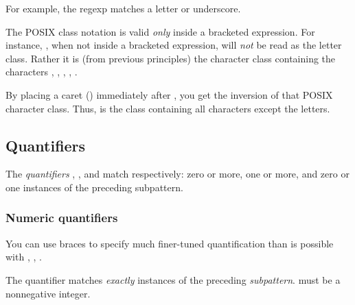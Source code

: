 {\medskip

\n For example, the regexp  
matches a letter or underscore.


The POSIX class notation is valid {\em only} inside a
bracketed expression.  For instance, \p{[:alpha:]},
when not inside a bracketed expression, will {\em not}
be read as the letter class.
Rather it is (from previous principles) the character
class containing the characters \p{:}, , ,
, .


By placing a caret (\p{^}) immediately after
\p{[:}, you get the inversion of that POSIX
character class.  Thus, \p{[:^alpha]}
is the class containing all characters
except the letters.

\subsection{Quantifiers}

The {\em quantifiers} \p{*}, \p{+}, and
 match respectively: zero or more, one or more,
and zero or one instances of the preceding subpattern.


\subsubsection{Numeric quantifiers}

You can use braces to specify much finer-tuned
quantification than is possible with \p{*}, \p{+}, .

The quantifier  matches {\em exactly} 
instances of the preceding {\em subpattern}.  
must be a nonnegative integer.

}
